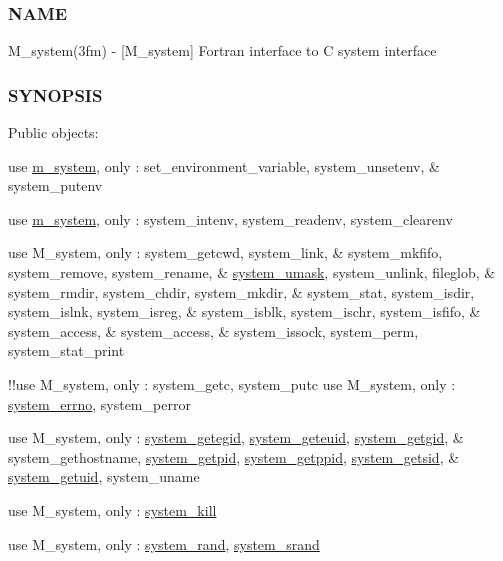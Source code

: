 \subsubsection*{N\+A\+ME}

M\+\_\+system(3fm) -\/ \mbox{[}M\+\_\+system\mbox{]} Fortran interface to C system interface \subsubsection*{S\+Y\+N\+O\+P\+S\+IS}

Public objects\+:

use \hyperlink{namespacem__system}{m\+\_\+system}, only \+: set\+\_\+environment\+\_\+variable, system\+\_\+unsetenv, \& system\+\_\+putenv

use \hyperlink{namespacem__system}{m\+\_\+system}, only \+: system\+\_\+intenv, system\+\_\+readenv, system\+\_\+clearenv

use M\+\_\+system, only \+: system\+\_\+getcwd, system\+\_\+link, \& system\+\_\+mkfifo, system\+\_\+remove, system\+\_\+rename, \& \hyperlink{interfacem__system_1_1system__umask}{system\+\_\+umask}, system\+\_\+unlink, fileglob, \& system\+\_\+rmdir, system\+\_\+chdir, system\+\_\+mkdir, \& system\+\_\+stat, system\+\_\+isdir, system\+\_\+islnk, system\+\_\+isreg, \& system\+\_\+isblk, system\+\_\+ischr, system\+\_\+isfifo, \& system\+\_\+access, \& system\+\_\+access, \& system\+\_\+issock, system\+\_\+perm, system\+\_\+stat\+\_\+print

!!use M\+\_\+system, only \+: system\+\_\+getc, system\+\_\+putc use M\+\_\+system, only \+: \hyperlink{interfacem__system_1_1system__errno}{system\+\_\+errno}, system\+\_\+perror

use M\+\_\+system, only \+: \hyperlink{interfacem__system_1_1system__getegid}{system\+\_\+getegid}, \hyperlink{interfacem__system_1_1system__geteuid}{system\+\_\+geteuid}, \hyperlink{interfacem__system_1_1system__getgid}{system\+\_\+getgid}, \& system\+\_\+gethostname, \hyperlink{interfacem__system_1_1system__getpid}{system\+\_\+getpid}, \hyperlink{interfacem__system_1_1system__getppid}{system\+\_\+getppid}, \hyperlink{interfacem__system_1_1system__getsid}{system\+\_\+getsid}, \& \hyperlink{interfacem__system_1_1system__getuid}{system\+\_\+getuid}, system\+\_\+uname

use M\+\_\+system, only \+: \hyperlink{interfacem__system_1_1system__kill}{system\+\_\+kill}

use M\+\_\+system, only \+: \hyperlink{interfacem__system_1_1system__rand}{system\+\_\+rand}, \hyperlink{interfacem__system_1_1system__srand}{system\+\_\+srand}

